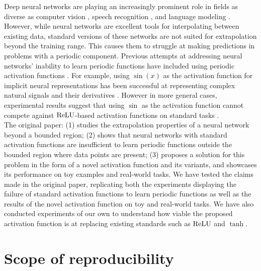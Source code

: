Deep neural networks are playing an increasingly prominent role in fields as diverse as computer vision \cite{10.1007/978-3-030-11024-6_1}, speech recognition \cite{deng_2016}, and language modeling \cite{melis2017state}. However, while neural networks are excellent tools for interpolating between existing data, standard versions of these networks are not suited for extrapolation beyond the training range. This causes them to struggle at making predictions in problems with a periodic component. Previous attempts at addressing neural networks' inability to learn periodic functions have included using periodic activation functions \cite{fourier_one, zhumekenov2019fourier}. For example, using $\sin(x)$ as the activation function for implicit neural representations has been successful at representing complex natural signals and their derivatives \cite{sitzmann2020implicit}. However in more general cases, experimental results suggest that using $\sin$ as the activation function cannot compete against $ \operatorname{ReLU} $-based activation functions \cite{Ramachandran2017SwishAS, DBLP:conf/icml/NairH10, clevert2016fast, xu2015empirical} on standard tasks \cite{Parascandolo2017TamingTW}. \\

The original paper: (1) studies the extrapolation properties of a neural network beyond a bounded region; (2) shows that neural networks with standard activation functions are insufficient to learn periodic functions outside the bounded region where data points are present; (3) proposes a solution for this problem in the form of a novel activation function and its variants, and showcases its performance on toy examples and real-world tasks. We have tested the claims made in the original paper, replicating both the experiments displaying the failure of standard activation functions to learn periodic functions as well as the results of the novel activation function on toy and real-world tasks. We have also conducted experiments of our own to understand how viable the proposed activation function is at replacing existing standards such as $\operatorname{ReLU}$ and $\tanh$. 

\section{Scope of reproducibility}

